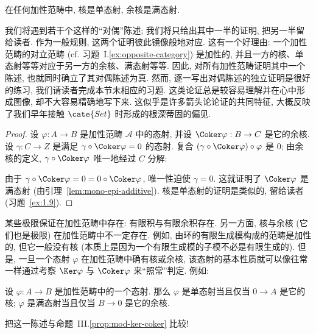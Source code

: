 \begin{lemma}\label{lem:kernels-mono-cokernels-epi}
在任何加性范畴中, 核是单态射, 余核是满态射.
\end{lemma}

\indent 我们将遇到若干个这样的``对偶''陈述; 我们将只给出其中一半的证明, 把另一半留给读者. 作为一般规则, 这两个证明彼此镜像般地对应. 这有一个好理由: 一个加性范畴的对立范畴 (cf. 习题~I.\ref{ex:opposite-category}) 是加性的, 并且一方的核、单态射等等对应于另一方的余核、满态射等等. 因此, 对所有加性范畴证明其中一个陈述, 也就同时确立了其对偶陈述为真.
然而, 逐一写出对偶陈述的独立证明是很好的练习, 我们请读者完成本节末相应的习题. 这类论证总是较容易理解并在心中形成图像, 却不大容易精确地写下来. 这似乎是许多箭头论论证的共同特征, 大概反映了我们早年接触 $\cate{Set}$ 时形成的根深蒂固的偏见.
\begin{proof}
设 $\varphi:A\to B$ 是加性范畴 $\mathcal{A}$ 中的态射, 并设 $\Coker\varphi:B\to C$ 是它的余核. 设 $\gamma:C\to Z$ 是满足 $\gamma\circ\Coker\varphi=0$ 的态射. 复合 $(\gamma\circ\Coker\varphi)\circ\varphi$ 是 $0$; 由余核的定义, $\gamma\circ\Coker\varphi$ 唯一地经过 $C$ 分解:
\begin{center}
\end{center}
由于 $\gamma\circ\Coker\varphi=0=0\circ\Coker\varphi$, 唯一性迫使 $\gamma=0$. 这就证明了 $\Coker\varphi$ 是满态射 (由引理~\ref{lem:mono-epi-additive}).
核是单态射的证明是类似的, 留给读者 (习题~\ref{ex:1.9}).
\end{proof}

\indent 某些极限保证在加性范畴中存在: 有限积与有限余积存在. 另一方面, 核与余核 (它们也是极限) 在加性范畴中不一定存在. 例如, 由环的有限生成模构成的范畴是加性的, 但它一般没有核 (本质上是因为一个有限生成模的子模不必是有限生成的). 但是, 一旦一个态射 $\varphi$ 在加性范畴中确有核或余核, 该态射的基本性质就可以像往常一样通过考察 $\Ker\varphi$ 与 $\Coker\varphi$ 来``照常''判定. 例如:

\begin{lemma}\label{lem:kernel-zero-mono}
设 $\varphi:A\to B$ 是加性范畴中的一个态射. 那么 $\varphi$ 是单态射当且仅当 $0\to A$ 是它的核; $\varphi$ 是满态射当且仅当 $B\to 0$ 是它的余核.
\end{lemma}

\indent 把这一陈述与命题~III.\ref{prop:mod-ker-coker} 比较!

